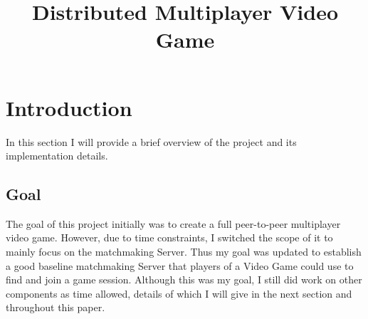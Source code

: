 \documentclass[conference]{IEEEtran}
\begin{document}
\title{Distributed Multiplayer Video Game}

\author{
}

\maketitle

\begin{abstract}

\end{abstract}

\section{Introduction}
In this section I will provide a brief overview of the project and its implementation details.

\subsection{Goal}
The goal of this project initially was to create a full peer-to-peer multiplayer video game.
However, due to time constraints, I switched the scope of it to mainly focus on the matchmaking Server.
Thus my goal was updated to establish a good baseline matchmaking Server that players of a Video Game could use to find and join a game session.
Although this was my goal, I still did work on other components as time allowed, details of which I will give in the next section and throughout this paper.
\end{document}
